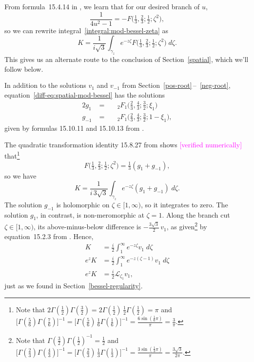 \documentclass{article}
\newcommand{\laplace}{\mathcal{L}}
\begin{document}
From formula~15.4.14 in \cite{dlmf}, we learn that for our desired branch of $u$,
\[ \frac{1}{4u^2 - 1} = -F\big(\tfrac{1}{3}, \tfrac{2}{3}; \tfrac{1}{2}; \zeta^2\big), \]
so we can rewrite integral~\eqref{integral:mod-bessel-zeta} as
\[ K = \frac{1}{i\sqrt{3}} \int_{\gamma_z} e^{-z\zeta} F\big(\tfrac{1}{3}, \tfrac{2}{3}; \tfrac{1}{2}; \zeta^2\big)\;d\zeta. \]
This gives us an alternate route to the conclusion of Section~\ref{spatial}, which we'll follow below.

In addition to the solutions $v_1$ and $v_{-1}$ from Section~\ref{pos-root}\,--\, \ref{neg-root}, equation~\eqref{diff-eq:spatial-mod-bessel} has the solutions
\begin{alignat*}{2}
g_1 &\;=\;& & {}_2F_1\big(\tfrac{2}{3}, \tfrac{4}{3}; \tfrac{3}{2}; \xi_1\big) \\
g_{-1} &\;=\;&  & {}_2F_1\big(\tfrac{2}{3}, \tfrac{4}{3}; \tfrac{3}{2}; 1-\xi_1\big),
\end{alignat*}
given by formulas 15.10.11 and 15.10.13 from \cite{dlmf}.

The quadratic transformation identity 15.8.27 from \cite{dlmf} shows \textcolor{magenta}{[verified numerically]} that\footnote{Note that $2\Gamma(\tfrac{1}{2})\Gamma(\tfrac{3}{2}) = 2\Gamma(\tfrac{1}{2})\,\tfrac{1}{2}\Gamma(\tfrac{1}{2}) = \pi$ and $\big[\Gamma(\tfrac{5}{6})\Gamma(\tfrac{7}{6})\big]^{-1} = \big[\Gamma(\tfrac{5}{6})\,\tfrac{1}{6}\Gamma(\tfrac{1}{6})\big]^{-1} = \frac{6\sin(\tfrac{1}{6} \pi)}{\pi} = \frac{3}{\pi}$.}
\[ F\big(\tfrac{1}{3}, \tfrac{2}{3}; \tfrac{1}{2}; \zeta^2\big) = \tfrac{1}{3}(g_1 + g_{-1}), \]
so we have
\[ K = \frac{1}{i\,3\sqrt{3}} \int_{\gamma_z} e^{-z\zeta} (g_1 + g_{-1})\;d\zeta. \]
The solution $g_{-1}$ is holomorphic on $\zeta \in [1, \infty)$, so it integrates to zero. The solution $g_1$, in contrast, is non-meromorphic at $\zeta = 1$. Along the branch cut $\zeta \in [1, \infty)$, its above-minus-below difference is $-\tfrac{3\sqrt{3}}{2}\,v_1$,
as given\footnote{Note that $\Gamma(\tfrac{3}{2}) \Gamma(\tfrac{1}{2})^{-1} = \tfrac{1}{2}$ and $\big[\Gamma(\tfrac{2}{3})\Gamma(\tfrac{4}{3})\big]^{-1} = \big[\Gamma(\tfrac{2}{3})\,\tfrac{1}{3}\Gamma(\tfrac{1}{3})\big]^{-1} = \frac{3\sin(\tfrac{1}{3} \pi)}{\pi} = \frac{3\sqrt{3}}{2\pi}$.} by equation~15.2.3 from \cite{dlmf}.
Hence,
\begin{align*}
K & = \frac{i}{2} \int^\infty_1 e^{-z\zeta} v_1\;d\zeta \\
e^z K & = \frac{i}{2} \int^\infty_1 e^{-z(\zeta - 1)} v_1\;d\zeta \\
e^z K & = \tfrac{i}{2} \laplace_{\zeta_1} v_1,
\end{align*}
just as we found in Section~\ref{bessel-regularity}.
\end{document}
